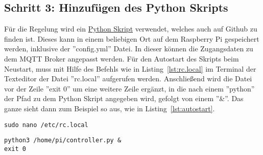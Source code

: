 \subsection{Schritt 3: Hinzufügen des Python Skripts}
Für die Regelung wird ein \href{https://github.com/maxbachmann-university/blind-controller}{Python Skript} verwendet, welches auch auf Github zu finden ist. Dieses kann in einem beliebigen Ort auf dem Raspberry Pi gespeichert werden, inklusive der ''config.yml'' Datei. In dieser können die Zugangsdaten zu dem MQTT Broker angepasst werden. Für den Autostart des Skripts beim Neustart, muss mit Hilfe des Befehls wie in Listing~\ref{lst:rc.local} im Terminal der Texteditor der Datei ''rc.local'' aufgerufen werden. Anschließend wird die Datei vor der Zeile ''exit 0'' um eine weitere Zeile ergänzt, in die nach einem ''python'' der Pfad zu dem Python Skript angegeben wird, gefolgt von einem ''\&''. Das ganze sieht dann zum Beispiel so aus, wie in Listing~\ref{lst:autostart}.

\begin{lstlisting}
sudo nano /etc/rc.local
\end{lstlisting}

\lstset{language=Python}
\begin{lstlisting}
python3 /home/pi/controller.py &
exit 0
\end{lstlisting}